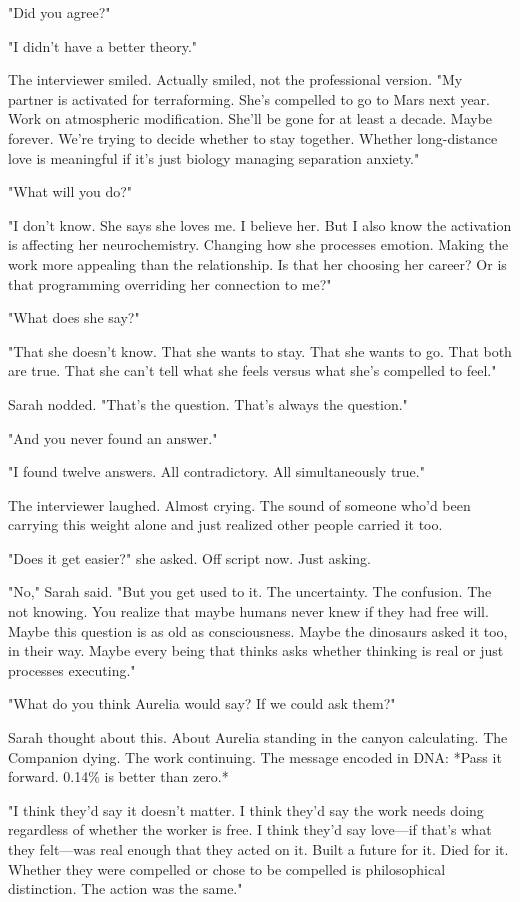 "Did you agree?"

"I didn't have a better theory."

The interviewer smiled. Actually smiled, not the professional version. "My partner is activated for terraforming. She's compelled to go to Mars next year. Work on atmospheric modification. She'll be gone for at least a decade. Maybe forever. We're trying to decide whether to stay together. Whether long-distance love is meaningful if it's just biology managing separation anxiety."

"What will you do?"

"I don't know. She says she loves me. I believe her. But I also know the activation is affecting her neurochemistry. Changing how she processes emotion. Making the work more appealing than the relationship. Is that her choosing her career? Or is that programming overriding her connection to me?"

"What does she say?"

"That she doesn't know. That she wants to stay. That she wants to go. That both are true. That she can't tell what she feels versus what she's compelled to feel."

Sarah nodded. "That's the question. That's always the question."

"And you never found an answer."

"I found twelve answers. All contradictory. All simultaneously true."

The interviewer laughed. Almost crying. The sound of someone who'd been carrying this weight alone and just realized other people carried it too.

"Does it get easier?" she asked. Off script now. Just asking.

"No," Sarah said. "But you get used to it. The uncertainty. The confusion. The not knowing. You realize that maybe humans never knew if they had free will. Maybe this question is as old as consciousness. Maybe the dinosaurs asked it too, in their way. Maybe every being that thinks asks whether thinking is real or just processes executing."

"What do you think Aurelia would say? If we could ask them?"

Sarah thought about this. About Aurelia standing in the canyon calculating. The Companion dying. The work continuing. The message encoded in DNA: *Pass it forward. 0.14\% is better than zero.*

"I think they'd say it doesn't matter. I think they'd say the work needs doing regardless of whether the worker is free. I think they'd say love—if that's what they felt—was real enough that they acted on it. Built a future for it. Died for it. Whether they were compelled or chose to be compelled is philosophical distinction. The action was the same."

